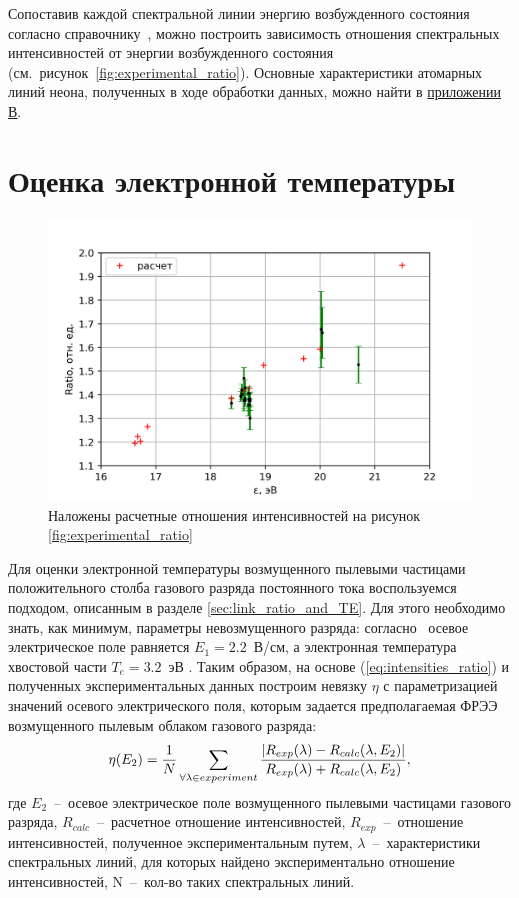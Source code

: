 Сопоставив каждой спектральной линии энергию возбужденного состояния согласно справочнику~\cite{Stritanov1966},
можно построить зависимость отношения спектральных интенсивностей от энергии возбужденного состояния (см.~рисунок~\ref{fig:experimental_ratio}).
Основные характеристики атомарных линий неона, полученных в ходе обработки данных, можно найти в \hyperref[app:app3]{приложении В}.

\section{Оценка электронной температуры}
\begin{figure}[t]
  \centering
  \includegraphics[width=16cm]{figures/Intensities_ratio}
  \caption{Наложены расчетные отношения интенсивностей на рисунок \ref{fig:experimental_ratio}}
  \label{fig:Intensities_ratio}
\end{figure}

Для оценки электронной температуры возмущенного пылевыми частицами положительного столба газового разряда постоянного
тока воспользуемся подходом, описанным в разделе \ref{sec:link_ratio_and_TE}. Для этого необходимо знать, как минимум,
параметры невозмущенного разряда: согласно~\cite{Pustylnik} осевое электрическое поле равняется $E_1 = 2.2$~В/см, а
электронная температура хвостовой части $T_e = 3.2$~эВ \cite{Zobnin2018}. Таким образом, на основе
(\ref{eq:intensities_ratio}) и полученных экспериментальных данных построим невязку $\eta$ с параметризацией значений
осевого электрического поля, которым задается предполагаемая ФРЭЭ возмущенного пылевым облаком газового разряда:
\begin{equation}
    \eta(E_2) = {1 \over N} \sum_{\forall \lambda \in experiment}{|R_{exp}(\lambda) - R_{calc}(\lambda, E_2)| \over {R_{exp}(\lambda) + R_{calc}(\lambda, E_2)}},
\end{equation}
где $E_2$~--~осевое электрическое поле возмущенного пылевыми частицами газового разряда, $R_{calc}$~--~расчетное
отношение интенсивностей, $R_{exp}$~--~отношение интенсивностей, полученное экспериментальным путем, $\lambda$~--~характеристики
спектральных линий, для которых найдено экспериментально отношение интенсивностей, N~--~кол-во таких спектральных линий.

